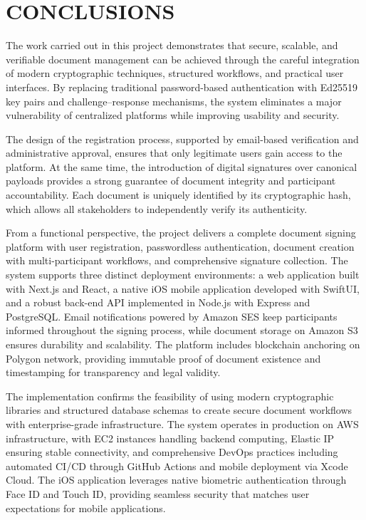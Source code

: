 \chapter*{CONCLUSIONS}

The work carried out in this project demonstrates that secure, scalable, and verifiable document management can be achieved through the careful integration of modern cryptographic techniques, structured workflows, and practical user interfaces. By replacing traditional password-based authentication with Ed25519 key pairs and challenge–response mechanisms, the system eliminates a major vulnerability of centralized platforms while improving usability and security.

The design of the registration process, supported by email-based verification and administrative approval, ensures that only legitimate users gain access to the platform. At the same time, the introduction of digital signatures over canonical payloads provides a strong guarantee of document integrity and participant accountability. Each document is uniquely identified by its cryptographic hash, which allows all stakeholders to independently verify its authenticity.

From a functional perspective, the project delivers a complete document signing platform with user registration, passwordless authentication, document creation with multi-participant workflows, and comprehensive signature collection. The system supports three distinct deployment environments: a web application built with Next.js and React, a native iOS mobile application developed with SwiftUI, and a robust back-end API implemented in Node.js with Express and PostgreSQL. Email notifications powered by Amazon SES keep participants informed throughout the signing process, while document storage on Amazon S3 ensures durability and scalability. The platform includes blockchain anchoring on Polygon network, providing immutable proof of document existence and timestamping for transparency and legal validity.

The implementation confirms the feasibility of using modern cryptographic libraries and structured database schemas to create secure document workflows with enterprise-grade infrastructure. The system operates in production on AWS infrastructure, with EC2 instances handling backend computing, Elastic IP ensuring stable connectivity, and comprehensive DevOps practices including automated CI/CD through GitHub Actions and mobile deployment via Xcode Cloud. The iOS application leverages native biometric authentication through Face ID and Touch ID, providing seamless security that matches user expectations for mobile applications.

